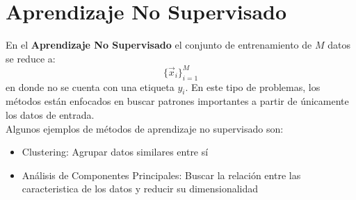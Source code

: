 \section{Aprendizaje No Supervisado}
En el \textbf{Aprendizaje No Supervisado} el conjunto de entrenamiento de $M$ datos se reduce a:
\[ \{\vec{x}_i\}_{i=1}^M \]
en donde no se cuenta con una etiqueta $y_i$. En este tipo de problemas, los métodos están enfocados en buscar patrones importantes a partir de únicamente los datos de entrada.
\\
Algunos ejemplos de métodos de aprendizaje no supervisado son:
\begin{itemize}[label=\textcolor{CTtitle}{\textbullet}]
\item Clustering: Agrupar datos similares entre sí
\item Análisis de Componentes Principales: Buscar la relación entre las caracteristica de los datos y reducir su dimensionalidad
\end{itemize}





